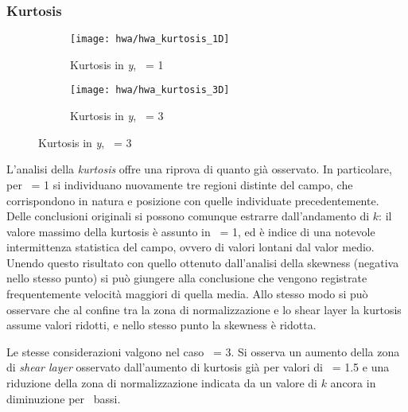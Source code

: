 \documentclass{article} %
\newcommand{\xd}{\nicefrac{\textrm{x}}{\textrm{D}}\ }
\newcommand{\yd}{\nicefrac{\textrm{y}}{\textrm{D}}\ }
\begin{document}
\subsubsection{Kurtosis}
\begin{figure}[h!]
	\begin{subfigure}{0.5\textwidth}
		\texttt{[image: hwa/hwa\_kurtosis\_1D]}
		\label{hwa_kurtosis_1D}
		\caption{Kurtosis in \textit{y}, \xd = 1}
	\end{subfigure}
	\begin{subfigure}{0.5\textwidth}
				\texttt{[image: hwa/hwa\_kurtosis\_3D]}
				\label{hwa_kurtosis_3D}
				\caption{Kurtosis in \textit{y}, \xd = 3}
	\end{subfigure}
\end{figure}
\begin{minipage}[t]{0.5\textwidth}
	\centering
	\begin{minipage}[t]{0.95\textwidth} \onehalfspacing
		L'analisi della \textit{kurtosis} offre una riprova di quanto già osservato. In particolare, per \xd = 1 si individuano nuovamente tre regioni distinte del campo, che corrispondono in natura e posizione con quelle individuate precedentemente. Delle conclusioni originali si possono comunque estrarre dall'andamento di $k$: il valore massimo della kurtosis è assunto in \yd = 1, ed è indice di una notevole intermittenza statistica del campo, ovvero di valori lontani dal valor medio. Unendo questo risultato con quello ottenuto dall'analisi della skewness (negativa nello stesso punto) si può giungere alla conclusione che vengono registrate frequentemente velocità maggiori di quella media. Allo stesso modo si può osservare che al confine tra la zona di normalizzazione e lo shear layer la kurtosis assume valori ridotti, e nello stesso punto la skewness è ridotta.
	\end{minipage}
\end{minipage}
\begin{minipage}[t]{0.5\textwidth}
	\centering
	\begin{minipage}[t]{0.95\textwidth} \onehalfspacing
		Le stesse considerazioni valgono nel caso \xd = 3. Si osserva un aumento della zona di \textit{shear layer} osservato dall'aumento di kurtosis già per valori di \yd = 1.5 e una riduzione della zona di normalizzazione indicata da un valore di $k$ ancora in diminuzione per \yd bassi.
	\end{minipage}
\end{minipage}
\newpage
\end{document}
